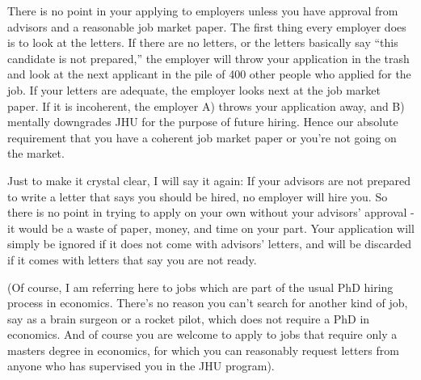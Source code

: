 \documentclass{econtex}
\begin{document}
\begin{enumerate}
There is no point in your applying to employers unless you have
approval from advisors and a reasonable job market paper.  The first
thing every employer does is to look at the letters.  If there are no
letters, or the letters basically say ``this candidate is not
prepared,'' the employer will throw your application in the trash and
look at the next applicant in the pile of 400 other people who applied
for the job.  If your letters are adequate, the employer looks next at
the job market paper.  If it is incoherent, the employer A) throws
your application away, and B) mentally downgrades JHU for the purpose
of future hiring.  Hence our absolute requirement that you have a coherent
job market paper or you're not going on the market.

Just to make it crystal clear, I will say it again: If your advisors
are not prepared to write a letter that says you should be hired, no
employer will hire you.  So there is no point in trying to apply on
your own without your advisors' approval - it would be a waste of
paper, money, and time on your part.  Your application will simply be
ignored if it does not come with advisors' letters, and will be discarded
if it comes with letters that say you are not ready.

(Of course, I am referring here to jobs which are part of the usual PhD hiring 
process in economics.  There's no reason you can't search for another kind of 
job, say as a brain surgeon or a rocket pilot, which does not require a 
PhD in economics.  And of course you are welcome to apply to jobs that require 
only a masters degree in economics, for which you can reasonably request letters 
from anyone who has supervised you in the JHU program).  


\end{enumerate}
\end{document}
